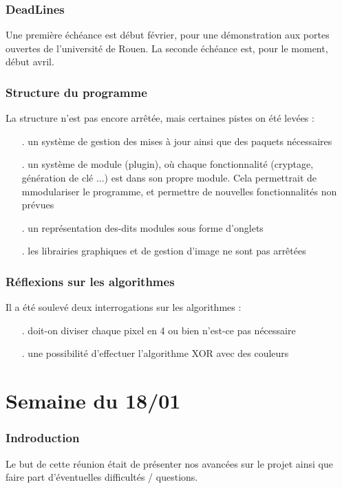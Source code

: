 \documentclass{report}
\begin{document}
\section*{DeadLines}
Une première échéance est début février, pour une démonstration aux portes ouvertes de l'université de Rouen.
La seconde échéance est, pour le moment, début avril.

\section*{Structure du programme}
La structure n'est pas encore arrêtée, mais certaines pistes on été levées :
\begin{itemize}
	\item[.] un système de gestion des mises à jour ainsi que des paquets nécessaires
	\item[.] un système de module (plugin), où chaque fonctionnalité (cryptage, génération de clé ...) est dans son propre module. Cela permettrait de mmodulariser le programme, et permettre de nouvelles fonctionnalités non prévues
	\item[.] un représentation des-dits modules sous forme d'onglets
	\item[.] les librairies graphiques et de gestion d'image ne sont pas arrêtées
\end{itemize}

\section*{Réflexions sur les algorithmes}
Il a été soulevé deux interrogations sur les algorithmes :
\begin{itemize}
	\item[.] doit-on diviser chaque pixel en 4 ou bien n'est-ce pas nécessaire
	\item[.] une possibilité d'effectuer l'algorithme XOR avec des couleurs
\end{itemize}

\part*{Semaine du 18/01}
\section*{Indroduction}
Le but de cette réunion était de présenter nos avancées sur le projet ainsi que faire part d'éventuelles difficultés / questions.
\end{document}
